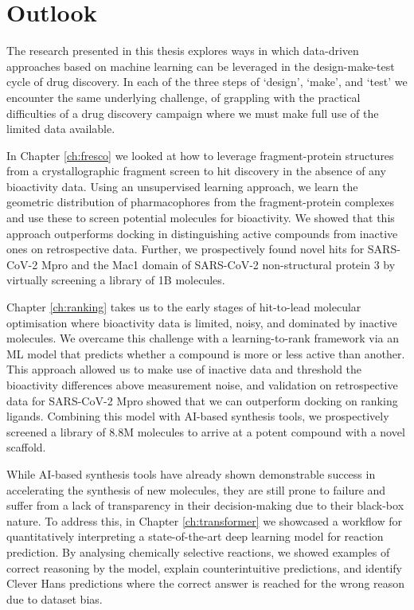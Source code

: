 \chapter{Outlook} \label{ch:outlook}

The research presented in this thesis explores ways in which data-driven approaches based on machine learning can be leveraged in the design-make-test cycle of drug discovery. In each of the three steps of `design', `make', and `test' we encounter the same underlying challenge, of grappling with the practical difficulties of a drug discovery campaign where we must make full use of the limited data available.

In Chapter \ref{ch:fresco} we looked at how to leverage fragment-protein structures from a crystallographic fragment screen to hit discovery in the absence of any bioactivity data. Using an unsupervised learning approach, we learn the geometric distribution of pharmacophores from the fragment-protein complexes and use these to screen potential molecules for bioactivity. We showed that this approach outperforms docking in distinguishing active compounds from inactive ones on retrospective data. Further, we prospectively found novel hits for SARS-CoV-2 Mpro and the Mac1 domain of SARS-CoV-2 non-structural protein 3 by virtually screening a library of 1B molecules.

Chapter \ref{ch:ranking} takes us to the early stages of hit-to-lead molecular optimisation where bioactivity data is limited, noisy, and dominated by inactive molecules. We overcame this challenge with a learning-to-rank framework via an ML model that predicts whether a compound is more or less active than another. This approach allowed us to make use of inactive data and threshold the bioactivity differences above measurement noise, and validation on retrospective data for SARS-CoV-2 Mpro showed that we can outperform docking on ranking ligands. Combining this model with AI-based synthesis tools, we prospectively screened a library of 8.8M molecules to arrive at a potent compound with a novel scaffold.

While AI-based synthesis tools have already shown demonstrable success in accelerating the synthesis of new molecules, they are still prone to failure and suffer from a lack of transparency in their decision-making due to their black-box nature. To address this, in Chapter \ref{ch:transformer} we showcased a workflow for quantitatively interpreting a state-of-the-art deep learning model for reaction prediction. By analysing chemically selective reactions, we showed examples of correct reasoning by the model, explain counterintuitive predictions, and identify Clever Hans predictions where the correct answer is reached for the wrong reason due to dataset bias.

